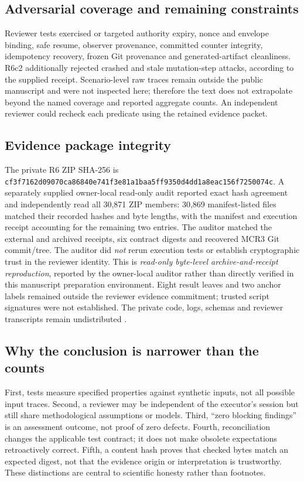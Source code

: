 \documentclass[11pt,twocolumn]{article}
\begin{document}
\subsection{Adversarial coverage and remaining constraints}
Reviewer tests exercised or targeted authority expiry, nonce and envelope binding, safe resume, observer provenance, committed counter integrity, idempotency recovery, frozen Git provenance and generated-artifact cleanliness. R6c2 additionally rejected crashed and stale mutation-step attacks, according to the supplied receipt. Scenario-level raw traces remain outside the public manuscript and were not inspected here; therefore the text does not extrapolate beyond the named coverage and reported aggregate counts. An independent reviewer could recheck each predicate using the retained evidence packet.

\subsection{Evidence package integrity}
The private R6 ZIP SHA-256 is \texttt{cf3f7162d090\allowbreak 70ca86840e74\allowbreak 1f3e81a1baa5\allowbreak ff9350d4dd1a\allowbreak 8eac156f7250\allowbreak 074c}. A separately supplied owner-local read-only audit reported exact hash agreement and independently read all 30,871 ZIP members: 30,869 manifest-listed files matched their recorded hashes and byte lengths, with the manifest and execution receipt accounting for the remaining two entries. The auditor matched the external and archived receipts, six contract digests and recovered MCR3 Git commit/tree. The auditor did \emph{not} rerun execution tests or establish cryptographic trust in the reviewer identity. This is \emph{read-only byte-level archive-and-receipt reproduction}, reported by the owner-local auditor rather than directly verified in this manuscript preparation environment. Eight result leaves and two anchor labels remained outside the reviewer evidence commitment; trusted script signatures were not established. The private code, logs, schemas and reviewer transcripts remain undistributed \cite{mcrAudit}.

\subsection{Why the conclusion is narrower than the counts}
First, tests measure specified properties against synthetic inputs, not all possible input traces. Second, a reviewer may be independent of the executor's session but still share methodological assumptions or models. Third, ``zero blocking findings'' is an assessment outcome, not proof of zero defects. Fourth, reconciliation changes the applicable test contract; it does not make obsolete expectations retroactively correct. Fifth, a content hash proves that checked bytes match an expected digest, not that the evidence origin or interpretation is trustworthy. These distinctions are central to scientific honesty rather than footnotes.
\end{document}
